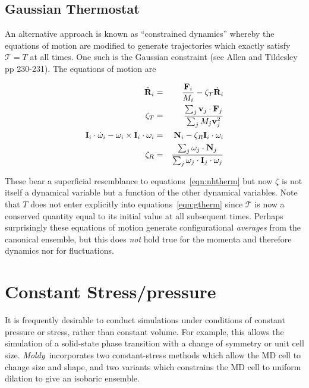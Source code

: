 \documentclass[a4paper,twoside]{report}
\providecommand{\bm}[1]{\mathbf{#1}}
\newcommand{\moldy}{\emph{Moldy}}
\begin{document}
\subsection{Gaussian Thermostat}
An alternative approach is known as ``constrained dynamics'' whereby
the equations of motion are modified to generate trajectories which
exactly satisfy $\mathcal{T} = T$ at all times.  One such is the Gaussian
constraint (see Allen and Tildesley\cite{allen:87} pp 230-231). The
equations of motion are 

\begin{eqnarray}
\label{eqn:gtherm}
\itemsep=0.5em
\ddot{\bm{R}}_i &=& \frac{\bm{F}_i}{M_i} - \zeta_T \dot{\bm{R}}_i \nonumber \\
\zeta_T &=& \frac{\sum_j\bm{v}_j \cdot \bm{F}_j}{\sum_j M_j\bm{v}_j^2} \\
\bm{I}_i \cdot \dot{\bm{\omega}}_i - \bm{\omega}_i \times \bm{I}_i
\cdot
\bm{\omega}_i &=& \bm{N}_i - \zeta_R \bm{I}_i \cdot \bm{\omega}_i \nonumber \\
\zeta_R &=& \frac{\sum_j\bm{\omega}_j \cdot \bm{N}_j}{\sum_j
  \bm{\omega}_j \cdot \bm{I}_j \cdot \bm{\omega}_j}\nonumber
\end{eqnarray}

These bear a superficial resemblance to equations~\ref{eqn:nhtherm}
but now $\zeta$ is not itself a dynamical variable but a function of the
other dynamical variables.  Note
that $T$ does not enter explicitly into  equations~\ref{eqn:gtherm}
since $\mathcal{T}$ is now a conserved quantity equal to its initial
value at all subsequent times. Perhaps surprisingly these equations of
motion generate configurational \emph{averages} from the canonical
ensemble, but this does \emph{not} hold true for the momenta and
therefore dynamics nor for fluctuations. 

\section{Constant Stress/pressure}%
\label{sec:const-stress}
It is frequently desirable to conduct simulations under conditions of
constant pressure or stress, rather than constant volume.  For
example, this allows the simulation of a solid-state phase transition
with a change of symmetry or unit cell size.  \moldy\ incorporates two
constant-stress methods which allow the MD cell to change size and
shape, and two variants which constrains the MD cell to uniform
dilation to give an isobaric ensemble.
\end{document}
